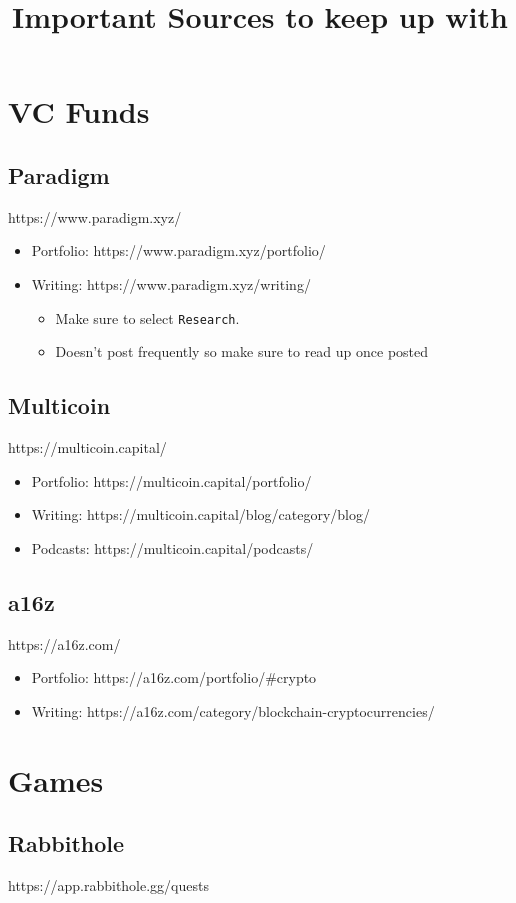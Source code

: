 \documentclass{../notes}
\title{Important Sources to keep up with}
\begin{document}
\maketitle
\section{VC Funds}
\subsection{Paradigm}
https://www.paradigm.xyz/

\begin{itemize}
    \item Portfolio: https://www.paradigm.xyz/portfolio/
    \item Writing: https://www.paradigm.xyz/writing/
        \begin{itemize}
            \item Make sure to select \verb|Research|. 
            \item Doesn't post frequently so make sure to read up once posted
        \end{itemize}
\end{itemize}

\subsection{Multicoin}
https://multicoin.capital/

\begin{itemize}
    \item Portfolio: https://multicoin.capital/portfolio/
    \item Writing: https://multicoin.capital/blog/category/blog/
    \item Podcasts: https://multicoin.capital/podcasts/
\end{itemize}

\subsection{a16z}
https://a16z.com/

\begin{itemize}
    \item Portfolio: https://a16z.com/portfolio/\#crypto
    \item Writing: https://a16z.com/category/blockchain-cryptocurrencies/
\end{itemize}

\section{Games}
\subsection{Rabbithole}
https://app.rabbithole.gg/quests
\end{document}
